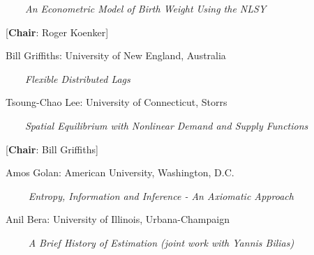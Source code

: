 $\qquad ${\em An Econometric Model of Birth Weight Using the NLSY}



\vspace{10mm}
\begin{center}
\end{center}


  [{\bf Chair}: Roger Koenker]

Bill Griffiths:  University  of New England, Australia

$\qquad ${\em Flexible Distributed Lags}
 
Tsoung-Chao  Lee: University of Connecticut, Storrs

$\qquad ${\em Spatial Equilibrium with Nonlinear Demand and Supply Functions}
 

[{\bf Chair}: Bill Griffiths]

Amos Golan:  American University, Washington, D.C.

$\qquad$ {\em Entropy, Information and Inference - An Axiomatic Approach}

Anil Bera: University  of Illinois, Urbana-Champaign

$\qquad $ {\em A Brief History of Estimation (joint work with Yannis Bilias)}



 







